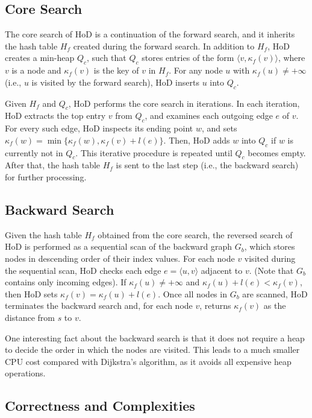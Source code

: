 \documentclass{sig-alternate}
\def\GB{G_b}
\def\HF{H_f}
\def\kf{\kappa_f}
\def\QC{Q_c}
\begin{document}
\begin{sloppy}
\subsection{Core Search} \label{sec:sssp-core}

The core search of HoD is a continuation of the forward search, and it inherits the hash table $\HF$ created during the forward search. In addition to $\HF$, HoD creates a min-heap $\QC$, such that $\QC$ stores entries of the form $\langle v, \kf(v)\rangle$, where $v$ is a node and $\kf(v)$ is the key of $v$ in $\HF$. For any node $u$ with $\kf(u) \ne +\infty$ (i.e., $u$ is visited by the forward search), HoD inserts $u$ into $\QC$.

Given $\HF$ and $\QC$, HoD performs the core search in iterations. In each iteration, HoD extracts the top entry $v$ from $\QC$, and examines each outgoing edge $e$ of $v$. For every such edge, HoD inspects its ending point $w$, and sets $\kf(w) = \min\{\kf(w), \kf(v) + l(e)\}$. Then, HoD adds $w$ into $\QC$ if $w$ is currently not in $\QC$. This iterative procedure is repeated until $\QC$ becomes empty. After that, the hash table $\HF$ is sent to the last step (i.e., the backward search) for further processing.

\subsection{Backward Search} \label{sec:sssp-backward}

Given the hash table $\HF$ obtained from the core search, the reversed search of HoD is performed as a sequential scan of the backward graph $\GB$, which stores nodes in descending order of their index values. For each node $v$ visited during the sequential scan, HoD checks each edge $e = \langle u, v\rangle$ adjacent to $v$. (Note that $\GB$ contains only incoming edges). If $\kf(u) \ne +\infty$ and $\kf(u) + l(e) < \kf(v)$, then HoD sets $\kf(v) = \kf(u) + l(e)$. Once all nodes in $\GB$ are scanned, HoD terminates the backward search and, for each node $v$, returns $\kf(v)$ as the distance from $s$ to $v$.

One interesting fact about the backward search is that it does not require a heap to decide the order in which the nodes are visited. This leads to a much smaller CPU cost compared with Dijkstra's algorithm, as it avoids all expensive heap operations.

\subsection{Correctness and Complexities} \label{sec:sssp-proof}


\end{sloppy}
\end{document}
